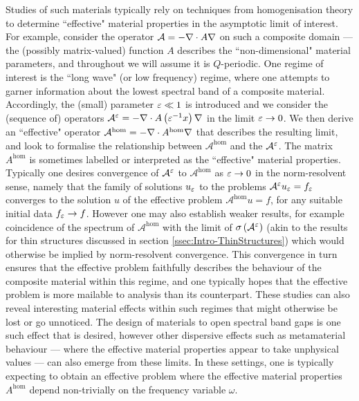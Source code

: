 Studies of such materials typically rely on techniques from homogenisation theory to determine ``effective" material properties in the asymptotic limit of interest.
For example, consider the operator $\mathcal{A}=-\nabla\cdot A\nabla$ on such a composite domain --- the (possibly matrix-valued) function $A$ describes the ``non-dimensional" material parameters, and throughout we will assume it is $Q$-periodic.
One regime of interest is the ``long wave" (or low frequency) regime, where one attempts to garner information about the lowest spectral band of a composite material.
Accordingly, the (small) parameter $\varepsilon\ll 1$ is introduced and we consider the (sequence of) operators $\mathcal{A}^{\varepsilon} = -\nabla\cdot A\left( \varepsilon^{-1}x \right)\nabla$ in the limit $\varepsilon\rightarrow0$.
We then derive an ``effective" operator $\mathcal{A}^{\mathrm{hom}} = -\nabla\cdot A^{\mathrm{hom}}\nabla$ that describes the resulting limit, and look to formalise the relationship between $\mathcal{A}^{\mathrm{hom}}$ and the $\mathcal{A}^{\varepsilon}$.
The matrix $A^{\mathrm{hom}}$ is sometimes labelled or interpreted as the ``effective" material properties.
Typically one desires convergence of $\mathcal{A}^{\varepsilon}$ to $\mathcal{A}^{\mathrm{hom}}$ as $\varepsilon\rightarrow0$ in the norm-resolvent sense, namely that the family of solutions $u_{\varepsilon}$ to the problems $\mathcal{A}^{\varepsilon}u_{\varepsilon}=f_{\varepsilon}$ converges to the solution $u$ of the effective problem $\mathcal{A}^{\mathrm{hom}}u = f$, for any suitable initial data $f_{\varepsilon}\rightarrow f$.
However one may also establish weaker results, for example coincidence of the spectrum of $\mathcal{A}^{\mathrm{hom}}$ with the limit of $\sigma\left( \mathcal{A}^{\varepsilon} \right)$ (akin to the results for thin structures discussed in section \ref{ssec:Intro-ThinStructures}) which would otherwise be implied by norm-resolvent convergence.
This convergence in turn ensures that the effective problem faithfully describes the behaviour of the composite material within this regime, and one typically hopes that the effective problem is more mailable to analysis than its counterpart.
These studies can also reveal interesting material effects within such regimes that might otherwise be lost or go unnoticed.
The design of materials to open spectral band gaps is one such effect that is desired, however other dispersive effects such as metamaterial behaviour  --- where the effective material properties appear to take unphysical values --- can also emerge from these limits.
In these settings, one is typically expecting to obtain an effective problem where the effective material properties $A^{\mathrm{hom}}$ depend non-trivially on the frequency variable $\omega$.


